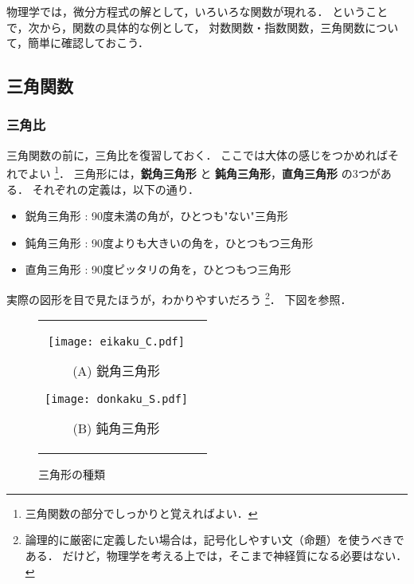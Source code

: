     物理学では，微分方程式の解として，いろいろな関数が現れる．
    ということで，次から，関数の具体的な例として，
    対数関数・指数関数，三角関数について，簡単に確認しておこう．

\subsection{三角関数}

\subsubsection{三角比}
    三角関数の前に，三角比を復習しておく．
    ここでは大体の感じをつかめればそれでよい
        \footnote{
            三角関数の部分でしっかりと覚えればよい．
        }．
    三角形には，\textbf{鋭角三角形} と \textbf{鈍角三角形}，\textbf{直角三角形} の3つがある．
    それぞれの定義は，以下の通り．
        \begin{itemize}
            \item 鋭角三角形 : 90度未満の角が，ひとつも"ない"三角形
            \item 鈍角三角形 : 90度よりも大きいの角を，ひとつもつ三角形
            \item 直角三角形 : 90度ピッタリの角を，ひとつもつ三角形
        \end{itemize}
    実際の図形を目で見たほうが，わかりやすいだろう
        \footnote{
            論理的に厳密に定義したい場合は，記号化しやすい文（命題）を使うべきである．
            だけど，物理学を考える上では，そこまで神経質になる必要はない．
        }．
    下図を参照．
    \begin{figure}[hbt]
        \begin{tabular}{cc}
            \begin{minipage}{0.5\hsize}
                \begin{center}
                    \texttt{[image: eikaku\_C.pdf]}

                    (A) 鋭角三角形
                \end{center}
            \end{minipage}
            \begin{minipage}{0.5\hsize}
                \begin{center}
                    \texttt{[image: donkaku\_S.pdf]}

                    (B) 鈍角三角形
                \end{center}
            \end{minipage}
        \end{tabular}
        \label{fig:sankakukei_no_katati}
        \caption{三角形の種類}
    \end{figure}

